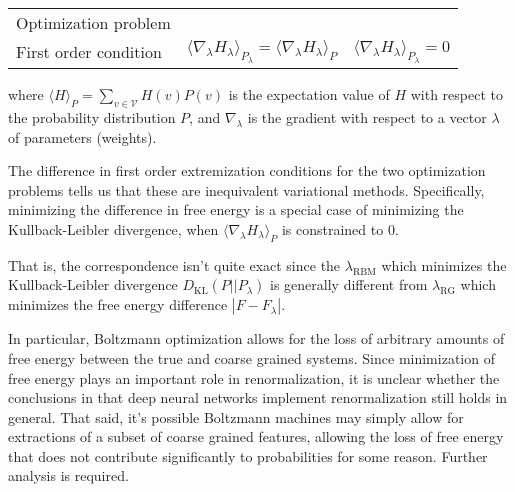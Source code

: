 \documentclass{article}
\theoremstyle{remark}
\theoremstyle{definition}
\begin{document}
\begin{table}[H]
\begin{center}
\def\arraystretch{2.5}
\setlength\tabcolsep{8pt}
\footnotesize
\begin{tabularx}{\textwidth}{@{} | Y | c | c | @{}}
\hline
 &  &   \\\hline
 
 Optimization problem & 
     &
         \\\hline
 First order condition & 
    $\langle \nabla_\lambda H_\lambda \rangle_{P_\lambda} = \langle \nabla_\lambda H_\lambda \rangle_{P}$ & 
        $\langle \nabla_\lambda H_\lambda \rangle_{P_\lambda} = 0$ \\\hline
\end{tabularx}
\end{center}
where $\langle H \rangle_P = \sum_{v \in \mathcal V} H(v) P(v)$ is the expectation value of $H$ with respect to the probability distribution $P$, and $\nabla_\lambda$ is the gradient with respect to a vector $\lambda$ of parameters (weights).
\end{table}

The difference in first order extremization conditions for the two optimization problems tells us that these are inequivalent variational methods. Specifically, minimizing the difference in free energy is a special case of minimizing the Kullback-Leibler divergence, when $\langle \nabla_\lambda H_\lambda \rangle_P$ is constrained to $0$. 

That is, the correspondence isn't quite exact since the $\lambda_\text{RBM}$ which minimizes the Kullback-Leibler divergence $D_\text{KL}(P || P_\lambda)$ is generally different from $\lambda_\text{RG}$ which minimizes the free energy difference $|F - F_\lambda|$.

In particular, Boltzmann optimization allows for the loss of arbitrary amounts of free energy between the true and coarse grained systems. Since minimization of free energy plays an important role in renormalization, it is unclear whether the conclusions in \cite{mehta_exact_2014} that deep neural networks implement renormalization still holds in general. That said, it's possible Boltzmann machines may simply allow for extractions of a subset of coarse grained features, allowing the loss of free energy that does not contribute significantly to probabilities for some reason. Further analysis is required.
\end{document}
